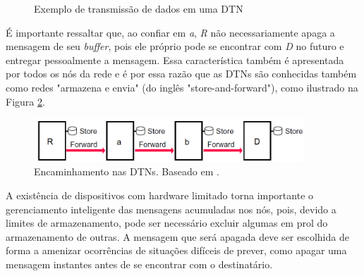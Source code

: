 \begin{figure}[htp!]
\centering
    \caption{Exemplo de transmissão de dados em uma DTN}
    \label{exemploComunicacaoSimplesDTN}
\end{figure}

É importante ressaltar que, ao confiar em \emph{a}, \emph{R} não necessariamente apaga a mensagem de seu \emph{buffer}, pois ele próprio pode se encontrar com \emph{D} no futuro e entregar pessoalmente a mensagem. Essa característica também é apresentada por todos os nós da rede e é por essa razão que as DTNs são conhecidas também como redes "armazena e envia" (do inglês "store-and-forward")\cite{de2007redes, umrKehr}, como ilustrado na Figura \ref{armazena_envia}. 

\begin{figure}[htp!]
\centering
\includegraphics[width=0.9\textwidth]{figuras/cap_2/secao_1/armazena_envia.png}
\caption{Encaminhamento nas DTNs. Baseado em \cite{umrKehr}.}
\label{armazena_envia}
\end{figure}

A existência de dispositivos com hardware limitado torna importante o gerenciamento inteligente das mensagens acumuladas nos nós, pois, devido a limites de armazenamento, pode ser necessário excluir algumas em prol do armazenamento de outras. A mensagem que será apagada deve ser escolhida de forma a amenizar ocorrências de situações difíceis de prever, como apagar uma mensagem instantes antes de se encontrar com o destinatário.

